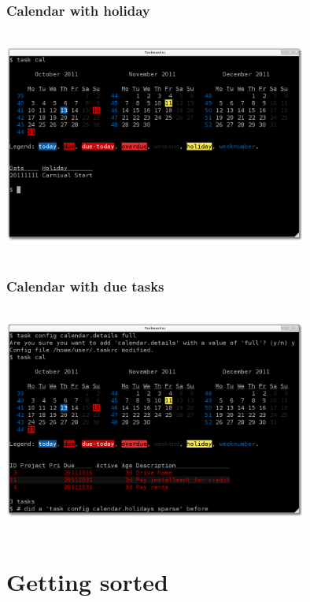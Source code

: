 \documentclass[t,handout]{beamer}
\begin{document}
\begin{frame}
\frametitle{Calendar with holiday}
\begin{center}
\includegraphics[width=10cm,height=7.5cm]{calendar_with_holiday_name.png}
\end{center}
\end{frame}

\begin{frame}
\frametitle{Calendar with due tasks}
\begin{center}
\includegraphics[width=10cm,height=7.5cm]{calendar_with_due_tasks.png}
\end{center}
\end{frame}

\section{Getting sorted}
\end{document}

